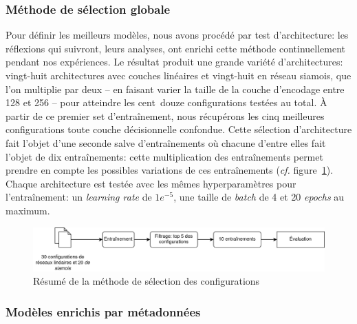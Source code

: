 \subsubsection{Méthode de sélection globale}

Pour définir les meilleurs modèles, nous avons procédé par test d'architecture: les réflexions qui suivront, leurs analyses, ont enrichi cette méthode continuellement pendant nos expériences. Le résultat produit une grande variété d'architectures: vingt-huit architectures avec couches linéaires et vingt-huit en réseau siamois, que l'on multiplie par deux -- en faisant varier la taille de la couche d'encodage entre 128 et 256 -- pour atteindre les cent~douze configurations testées au total. À partir de ce premier set d'entraînement, nous récupérons les cinq meilleures configurations toute couche décisionnelle confondue. Cette sélection d'architecture fait l'objet d'une seconde salve d'entraînements où chacune d'entre elles fait l'objet de dix entraînements: cette multiplication des entraînements permet prendre en compte les possibles variations de ces entraînements (\textit{cf.} figure~\ref{fig:chap4:50configurations}). Chaque architecture est testée avec les mêmes hyperparamètres pour l'entraînement: un \textit{learning rate} de $1e^{-5}$, une taille de \textit{batch} de 4 et 20 \textit{epochs} au maximum. 

\begin{figure}[ht]
    \centering
    \includegraphics[width=\linewidth]{figures/chap4/50config.png}
    \caption{Résumé de la méthode de sélection des configurations}
    \label{fig:chap4:50configurations}
\end{figure}



\subsubsection{Modèles enrichis par métadonnées}

